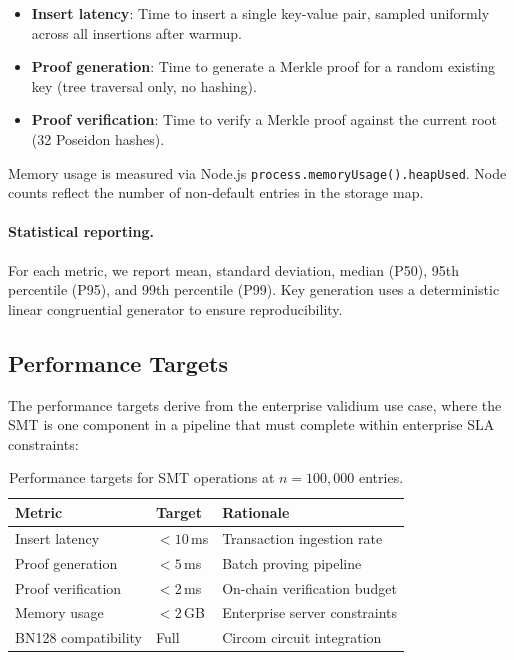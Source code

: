 \begin{itemize}
  \item \textbf{Insert latency}: Time to insert a single key-value pair, sampled uniformly across all insertions after warmup.
  \item \textbf{Proof generation}: Time to generate a Merkle proof for a random existing key (tree traversal only, no hashing).
  \item \textbf{Proof verification}: Time to verify a Merkle proof against the current root (32 Poseidon hashes).
\end{itemize}

Memory usage is measured via Node.js \texttt{process.memoryUsage().heapUsed}. Node counts reflect the number of non-default entries in the storage map.

\paragraph{Statistical reporting.} For each metric, we report mean, standard deviation, median (P50), 95th percentile (P95), and 99th percentile (P99). Key generation uses a deterministic linear congruential generator to ensure reproducibility.

\subsection{Performance Targets}

The performance targets derive from the enterprise validium use case, where the SMT is one component in a pipeline that must complete within enterprise SLA constraints:

\begin{table}[htbp]
\centering
\caption{Performance targets for SMT operations at $n = 100{,}000$ entries.}
\label{tab:targets}
\begin{tabular}{lll}
\hline
\textbf{Metric} & \textbf{Target} & \textbf{Rationale} \\
\hline
Insert latency & $< 10$\,ms & Transaction ingestion rate \\
Proof generation & $< 5$\,ms & Batch proving pipeline \\
Proof verification & $< 2$\,ms & On-chain verification budget \\
Memory usage & $< 2$\,GB & Enterprise server constraints \\
BN128 compatibility & Full & Circom circuit integration \\
\hline
\end{tabular}
\end{table}

